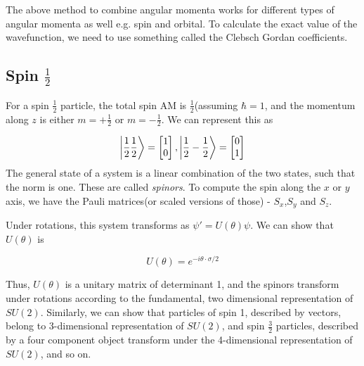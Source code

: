 \documentclass[11pt]{book}
\begin{document}
The above method to combine angular momenta works for different types of angular momenta as well e.g. spin and orbital. To calculate the exact value of the wavefunction, we need to use something called the Clebsch Gordan coefficients.

\subsection{Spin $\frac{1}{2}$}
For a spin $\frac{1}{2}$ particle, the total spin AM is $\frac{1}{2}$(assuming $\hbar = 1$, and the momentum along $z$ is either $m = +\frac{1}{2}$ or $m = -\frac{1}{2}$. We can represent this as

\begin{equation}
\ket {\frac{1}{2} \frac{1}{2}} = \begin{bmatrix} 1 \\ 0 \\ \end{bmatrix},
\ket {\frac{1}{2} -\frac{1}{2}} = \begin{bmatrix} 0 \\ 1 \\ \end{bmatrix}
\end{equation}
The general state of a system is a linear combination of the two states, such that the norm is one. These are called \emph{spinors}.
 To compute the spin along the $x$ or $y$ axis, we have the Pauli matrices(or scaled versions of those) - $S_x$,$S_y$ and $S_z$.

Under rotations, this system transforms as $\psi\prime = U(\theta)\psi$. We can show that $U(\theta)$ is 

$$
U(\theta) = e^{-i \theta \cdot \sigma / 2}
$$

Thus, $U(\theta)$ is a unitary matrix of determinant 1, and the spinors transform under rotations according to the fundamental, two dimensional representation of $SU(2)$. Similarly, we can show that particles of spin 1, described by vectors, belong to 3-dimensional representation of $SU(2)$, and spin $\frac{3}{2}$ particles, described by a four component object transform under the 4-dimensional representation of $SU(2)$, and so on.
\end{document}
